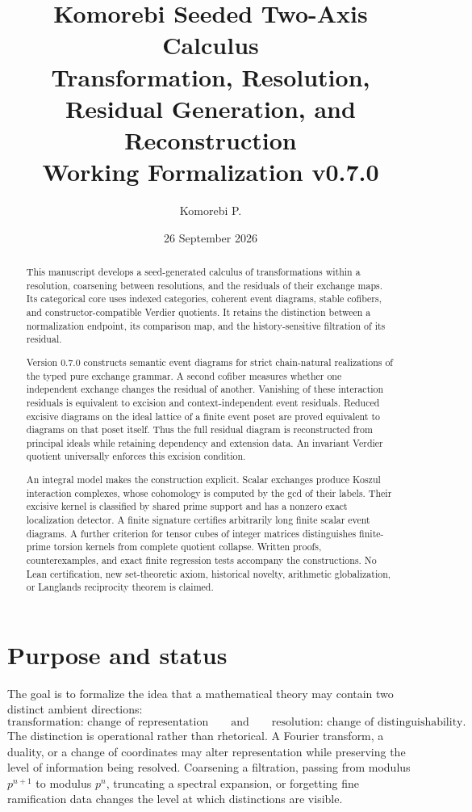 \documentclass[11pt]{article}
\title{\textbf{Komorebi Seeded Two-Axis Calculus}\\
\large Transformation, Resolution, Residual Generation, and Reconstruction\\[0.4em]
\normalsize Working Formalization v0.7.0}
\author{Komorebi P.}
\date{26 September 2026}
\theoremstyle{definition}
\theoremstyle{remark}
\begin{document}
\maketitle

\begin{abstract}
This manuscript develops a seed-generated calculus of transformations within a resolution, coarsening between resolutions, and the residuals of their exchange maps. Its categorical core uses indexed categories, coherent event diagrams, stable cofibers, and constructor-compatible Verdier quotients. It retains the distinction between a normalization endpoint, its comparison map, and the history-sensitive filtration of its residual.

Version 0.7.0 constructs semantic event diagrams for strict chain-natural realizations of the typed pure exchange grammar. A second cofiber measures whether one independent exchange changes the residual of another. Vanishing of these interaction residuals is equivalent to excision and context-independent event residuals. Reduced excisive diagrams on the ideal lattice of a finite event poset are proved equivalent to diagrams on that poset itself. Thus the full residual diagram is reconstructed from principal ideals while retaining dependency and extension data. An invariant Verdier quotient universally enforces this excision condition.

An integral model makes the construction explicit. Scalar exchanges produce Koszul interaction complexes, whose cohomology is computed by the gcd of their labels. Their excisive kernel is classified by shared prime support and has a nonzero exact localization detector. A finite signature certifies arbitrarily long finite scalar event diagrams. A further criterion for tensor cubes of integer matrices distinguishes finite-prime torsion kernels from complete quotient collapse. Written proofs, counterexamples, and exact finite regression tests accompany the constructions. No Lean certification, new set-theoretic axiom, historical novelty, arithmetic globalization, or Langlands reciprocity theorem is claimed.
\end{abstract}
\newpage

\tableofcontents
\newpage

\section{Purpose and status}

The goal is to formalize the idea that a mathematical theory may contain two distinct ambient directions:
\[
\boxed{\text{transformation: change of representation}}
\qquad\text{and}\qquad
\boxed{\text{resolution: change of distinguishability}.}
\]
The distinction is operational rather than rhetorical. A Fourier transform, a duality, or a change of coordinates may alter representation while preserving the level of information being resolved. Coarsening a filtration, passing from modulus $p^{n+1}$ to modulus $p^n$, truncating a spectral expansion, or forgetting fine ramification data changes the level at which distinctions are visible.
\end{document}
